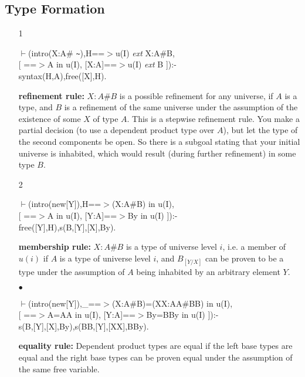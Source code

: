 \documentclass[11pt]{report}
\begin{document}
 \subsection{Type Formation}
 \begin{enumerate}
 \item[1]
\begin{sf}\begin{tabbing}
$\vdash$(intro(X:A\# {\verb`~`}),H==$>$u(I) \mbox{\it ext} X:A\#B, \\[-0.15ex]
\hspace{2em}[ ==$>$A in u(I), [X:A]==$>$u(I) \mbox{\it ext} B ]):-\\[-0.15ex]
\hspace{2em}syntax(H,A),free([X],H).
\end{tabbing}\end{sf}

 {\bf refinement rule:} $X:A\#B$ is a possible refinement
 for any universe, if $A$ is a type, and $B$ is a refinement of
 the same universe under the
 assumption of the existence of some $X$ of type $A$. This is a stepwise
 refinement rule. You make a partial decision (to use a dependent
 product type over $A$),
 but let the type of the second components be open. So there is a
 subgoal stating that your initial universe is inhabited,
 which would result (during further refinement) in some type $B$.
  
 \item[2]
\begin{sf}\begin{tabbing}
$\vdash$(intro(new[Y]),H==$>$(X:A\#B) in u(I), \\[-0.15ex]
\hspace{2em}[ ==$>$A in u(I), [Y:A]==$>$By in u(I) ]):-\\[-0.15ex]
\hspace{2em}free([Y],H),s(B,[Y],[X],By).
\end{tabbing}\end{sf}

 {\bf membership rule:} $X:A\#B$ is a type of universe level $i$,
 i.e. a member of $u(i)$ if $A$ is a type of universe level $i$,
 and $B_{[Y/X]}$ can be proven to be a type under the assumption of $A$
 being inhabited by an arbitrary element $Y$.
  
 \item[$\bullet$]
\begin{sf}\begin{tabbing}
$\vdash$(intro(new[Y]),\_\hspace{0.1em}==$>$(X:A\#B)=(XX:AA\#BB) in u(I),\\[-0.15ex]
\hspace{2em}[ ==$>$A=AA in u(I), [Y:A]==$>$By=BBy in u(I) ]):-\\[-0.15ex]
\hspace{2em}s(B,[Y],[X],By),s(BB,[Y],[XX],BBy).
\end{tabbing}\end{sf}

 {\bf equality rule:}
 Dependent product types are equal if the left base types are equal
 and the right base types can be proven equal under the assumption
 of the same free variable.
 \end{enumerate}
  
\end{document}
